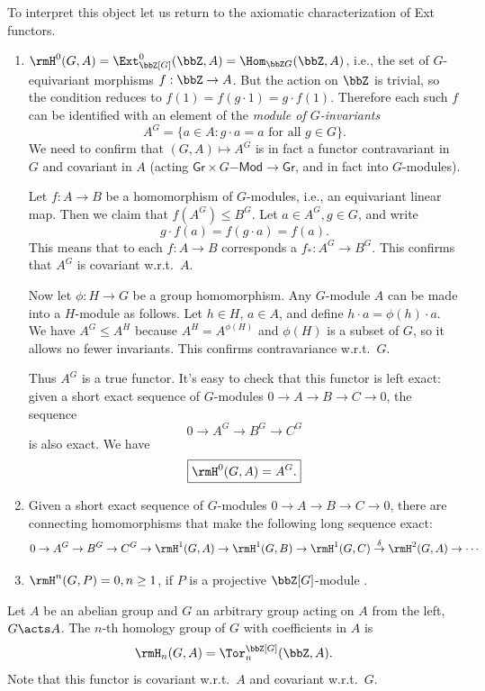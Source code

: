 To interpret this object let us return to the axiomatic characterization of Ext functors.

\begin{enumerate}
    \item $\rmH^0(G,A)=\Ext^0_{\bbZ[G]}(\bbZ,A)=\Hom_{\bbZ G}(\bbZ,A)$, i.e., the set of $G$-equivariant morphisms $f:\bbZ\to A$. But the action on $\bbZ$ is trivial, so the condition reduces to $f(1)=f(g\cdot 1)=g\cdot f(1)$. Therefore each such $f$ can be identified with an element of the \emph{module of $G$-invariants}
    \[A^G=\{a\in A:g\cdot a=a\text{ for all }g\in G\}.\]
    We need to confirm that $(G,A)\mapsto A^G$ is in fact a functor contravariant in $G$ and covariant in $A$ (acting $\mathsf{Gr}\times G\mathsf{-Mod}\to \mathsf{Gr}$, and in fact into $G$-modules).

    Let $f:A\to B$ be a homomorphism of $G$-modules, i.e., an equivariant linear map. Then we claim that $f(A^G)\leq B^G$. Let $a\in A^G, g\in G$, and write
    \[g\cdot f(a)=f(g\cdot a)=f(a).\]
    This means that to each $f:A\to B$ corresponds a $f_\ast :A^G\to B^G$. This confirms that $A^G$ is covariant w.r.t.\ $A$.

    Now let $\phi:H\to G$ be a group homomorphism. Any $G$-module $A$ can be made into a $H$-module as follows. Let $h\in H$, $a\in A$, and define $h\cdot a=\phi(h)\cdot a$. We have $A^G\leq A^H$ because $A^H=A^{\phi(H)}$ and $\phi(H)$ is a subset of $G$, so it allows no fewer invariants. This confirms contravariance w.r.t.\ $G$. 
    
    Thus $A^G$ is a true functor. It's easy to check that this functor is left exact: given a short exact sequence of $G$-modules $0\to A\to B\to C\to 0$, the sequence
    \[0\to A^G\to B^G\to C^G\]
    is also exact. We have
    \[\boxed{\rmH^0(G,A)=A^G.}\]
    
    \item Given a short exact sequence of $G$-modules $0\to A\to B\to C\to 0$, there are connecting homomorphisms that make the following long sequence exact:
    \[0\to A^G\to B^G\to C^G\to \rmH^1(G,A)\to \rmH^1(G,B)\to \rmH^1(G,C)\overset{\delta}{\to}\rmH^2(G,A)\to\cdots \]

    \item $\rmH^n(G,P)=0, n\geq 1$, if $P$ is a projective $\bbZ[G]$-module .
\end{enumerate}


\begin{defn}
    Let $A$ be an abelian group and $G$ an arbitrary group acting on $A$ from the left, $G\acts A$. The $n$-th homology group of $G$ with coefficients in $A$ is
    \[\rmH_n(G,A)=\Tor^{\bbZ[G]}_n(\bbZ,A).\]
    Note that this functor is covariant w.r.t.\ $A$ and covariant w.r.t.\ $G$.
\end{defn}

